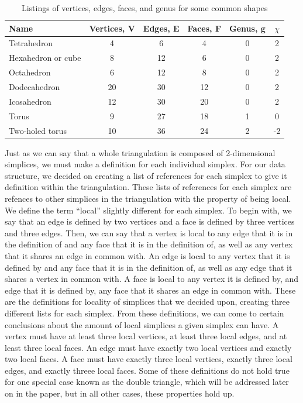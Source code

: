 \documentclass[12pt]{article}
\begin{document}
\begin{table}
\begin{tabular}{lccccc}
Name  &	Vertices, V &	Edges, E & Faces, F &	Genus, g & $\chi$\\
\hline 
Tetrahedron &	4 &	6 &	4 &	0 & 2\\
Hexahedron or cube &	8 &	12 &	6 &	0 &	2\\
Octahedron 	&	6 &	12 &	8 & 0 &	 2\\
Dodecahedron 	&	20 &	30 &	12 &	0&	 2\\
Icosahedron &	12 & 30 & 20 & 0	&	 2\\
Torus & 9 & 27 & 18 &	1 & 0\\
Two-holed torus & 10 & 36 & 24 &	2 & -2\\
\end{tabular}
\caption{Listings of vertices, edges, faces, and genus for some common shapes}
\label{EuChar}
\end{table}

\noindent Just as we can say that a whole triangulation is composed of 2-dimensional simplices, we must make a definition for each individual simplex. For our data structure, we decided on creating a list of references for each simplex to give it definition within the triangulation. These lists of references for each simplex are refences to other simplices in the triangulation with the property of being local. We define the term ``local'' slightly different for each simplex. To begin with, we say that an edge is defined by two vertices and a face is defined by three vertices and three edges. Then, we can say that a vertex is local to any edge that it is in the definition of and any face that it is in the definition of, as well as any vertex that it shares an edge in common with. An edge is local to any vertex that it is defined by and any face that it is in the definition of, as well as any edge that it shares a vertex in common with. A face is local to any vertex it is defined by, and edge that it is defined by, any face that it shares an edge in common with. These are the definitions for locality of simplices that we decided upon, creating three different lists for each simplex. From these definitions, we can come to certain conclusions about the amount of local simplices a given simplex can have. A vertex must have at least three local vertices, at least three local edges, and at least three local faces. An edge must have exactly two local vertices and exactly two local faces. A face must have exactly three local vertices, exactly three local edges, and exactly threee local faces. Some of these definitions do not hold true for one special case known as the double triangle, which will be addressed later on in the paper, but in all other cases, these properties hold up.
\end{document}
